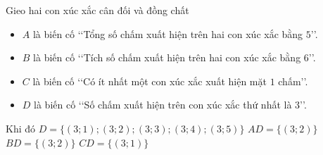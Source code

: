 \begin{ex}%
 Gieo hai con xúc xắc cân đối và đồng  chất
 \begin{itemize}
  \item $A$  là biến cố \lq\lq Tổng số chấm xuất hiện trên hai con xúc xắc bằng $5$\rq\rq.
  \item $B$  là biến cố \lq\lq Tích số chấm xuất hiện trên hai con xúc xắc bằng $6$\rq\rq.
  \item $C$ là biến cố \lq\lq Có ít nhất một con xúc xắc  xuất hiện mặt $1$ chấm\rq\rq.
  \item  $D$ là biến cố \lq\lq Số chấm xuất hiện trên con xúc xắc thứ nhất là $3$\rq\rq.
 \end{itemize}
 Khi đó 
  \choiceTF
  {$D=\{(3;1);(3;2);(3;3);(3;4); (3;5)\}$} 
  {\True $AD=\{(3;2)\}$} 
  {\True $BD=\{(3;2)  \}$}
  {\True  $CD=\{(3;1) \}$}
\end{ex}

